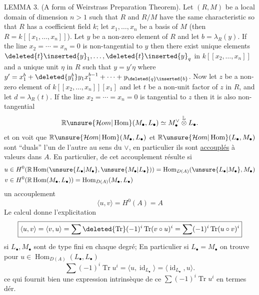 LEMMA 3. (A form of Weirstrass Preparation Theorem). Let $(R,M)$ be a local domain of dimension $n>1$ such that $R$ and $R/M$ have the same characteristic so that $R$ has a coefficient field $k$; let $x_1,\ldots,x_n$ be a basis of $M$ (then $R=k[[x_1,\ldots,x_n]]$). Let $y$ be a non-zero element of $R$ and let $b=\lambda_R(y)$. If the line $x_2=\cdots=x_n=0$ is non-tangential to $y$ then there exist unique elements $\deleted{t}\inserted{y}_1,\ldots,\deleted{t}\inserted{y}_q$ in $k[[x_2,\ldots,x_n]]$ and a unique unit $\eta$ in $R$ such that $y=y'\eta$ where $y'=x_1^b+\deleted{y_1^b}y_1x_1^{b-1}+\cdots+y_{\deleted{q}\inserted{b}}$. Now let $z$ be a non-zero element of $k[[x_2,\ldots,x_n]][x_1]$ and let $t$ be a non-unit factor of $z$ in $R$, and let $d=\lambda_R(t)$. If the line $x_2=\cdots=x_n=0$ is tangential to $z$ then it is also non-tangential
\[
\mathbb R\unsure{\mathcal Hom|\operatorname{Hom}}(M_\bullet,L_\bullet)\simeq M_\bullet^\vee\overset{\mathbb L}{\otimes}L_\bullet.
\]
et on voit que $\mathbb R\unsure{\mathcal Hom|\operatorname{Hom}}(M_\bullet,L_\bullet)$ et $\mathbb R\unsure{\mathcal Hom|\operatorname{Hom}}(L_\bullet,M_\bullet)$
sont ``duals'' l'un de l'autre au sens
du $\vee$, en particulier ils sont
\uline{accouplés} à valeurs dans $A$. En
particulier, de cet accouplement résulte
si
\[
\begin{aligned}
u&\in H^0(\mathbb R\operatorname{Hom}(\unsure{L_\bullet|M_\bullet},\unsure{M_\bullet|L_\bullet}))=\operatorname{Hom}_{D(A)}(\unsure{L_\bullet|M_\bullet},M_\bullet)\\
v&\in H^0(\mathbb R\operatorname{Hom}(M_\bullet,L_\bullet))=\operatorname{Hom}_{D(A)}(M_\bullet,L_\bullet)
\end{aligned}
\]
un accouplement
\[
\langle u,v\rangle=H^0(A)=A
\]
Le calcul donne l'explicitation
\[
\boxed{\langle u,v\rangle=\langle v,u\rangle=\sum\deleted{\operatorname{Tr}}(-1)^i\operatorname{Tr}(v\circ u)^i=\sum(-1)^i\operatorname{Tr}(u\circ v)^i}
\]
si $L_\bullet,M_\bullet$ sont  de type fini en
chaque degré; 
En particulier si $L_\bullet=M_\bullet$
on trouve pour $u\in\operatorname{Hom}_{D(A)}(L_\bullet,L_\bullet)$
\[
\boxed{\sum(-1)^i\operatorname{Tr}u^i=\langle u,\operatorname{id}_{L_\bullet}\rangle=\langle\operatorname{id}_{L_\bullet},u\rangle.}
\]
ce qui fournit bien une expression
intrinsèque de ce $\sum(-1)^i\operatorname{Tr}u^i$ en termes dér.
